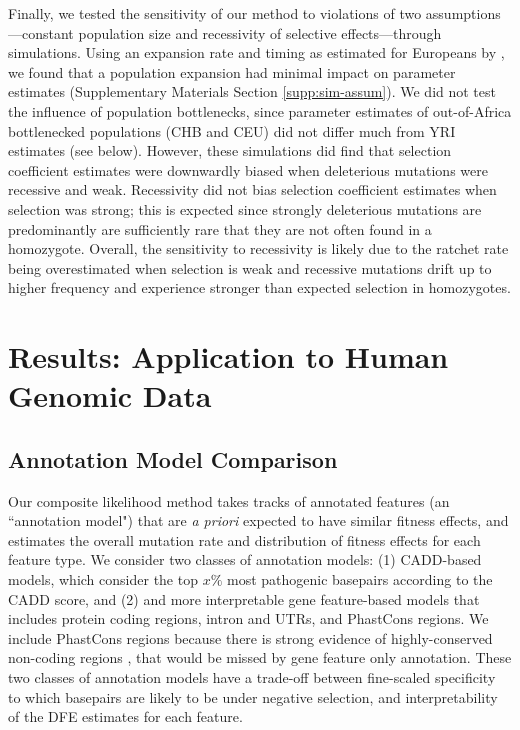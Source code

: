 \documentclass[11pt]{article}
\begin{document}
Finally, we tested the sensitivity of our method to violations of two
assumptions---constant population size and recessivity of selective
effects---through simulations. Using an expansion rate and timing as estimated
for Europeans by \textcite{Gutenkunst2009-pg}, we found that a population
expansion had minimal impact on parameter estimates (Supplementary Materials
Section \ref{supp:sim-assum}). We did not test the influence of population
bottlenecks, since parameter estimates of out-of-Africa bottlenecked
populations (CHB and CEU) did not differ much from YRI estimates (see below).
However, these simulations did find that selection coefficient estimates were
downwardly biased when deleterious mutations were recessive and weak.
Recessivity did not bias selection coefficient estimates when selection was
strong; this is expected since strongly deleterious mutations are predominantly
are sufficiently rare that they are not often found in a homozygote. Overall,
the sensitivity to recessivity is likely due to the ratchet rate being
overestimated when selection is weak and recessive mutations drift up to higher
frequency and experience stronger than expected selection in homozygotes.

\section*{Results: Application to Human Genomic Data}

\subsection*{Annotation Model Comparison}

Our composite likelihood method takes tracks of annotated features (an
``annotation model") that are \emph{a priori} expected to have similar fitness
effects, and estimates the overall mutation rate and distribution of fitness
effects for each feature type. We consider two classes of annotation models:
(1) CADD-based models, which consider the top $x\%$ most pathogenic basepairs
according to the CADD score, and (2) and more interpretable gene feature-based
models that includes protein coding regions, intron and UTRs, and PhastCons
regions. We include PhastCons regions because there is strong evidence of
highly-conserved non-coding regions
\parencite{Meader2010-hm,Harmston2013-tt,Katzman2007-gq,Siepel2005-wh}, that
would be missed by gene feature only annotation. These two classes of
annotation models have a trade-off between fine-scaled specificity to which
basepairs are likely to be under negative selection, and interpretability of
the DFE estimates for each feature.
\end{document}
